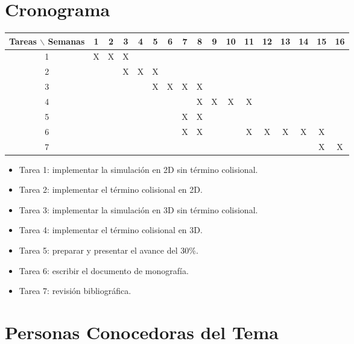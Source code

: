 \documentclass[12pt]{article}
\begin{document}
\section{Cronograma}

\begin{table}[htb]
	\begin{tabular}{|c|cccccccccccccccc| }
	\hline
	Tareas $\backslash$ Semanas & 1 & 2 & 3 & 4 & 5 & 6 & 7 & 8 & 9 & 10 & 11 & 12 & 13 & 14 & 15 & 16  \\
	\hline
	1 & X & X & X  &   &   &   &   &  &  &   &   &   &   &   &   &   \\
	2 &   &  & X & X & X &  &  &   &   &  &  &  &   &  &  &   \\
	3 &   &   &   &  & X  & X  & X  & X &   &   &   &  &   &   &  &   \\
	4 &  &  &  &  &  &  &  & X & X & X & X &   &   &   &   &   \\
    5 &  &  &  &  &  &  & X & X &  &  &  &   &   &   &   &   \\
	6 &   &   &   &   &  &   &  X & X  &  &   &  X & X &  X & X  & X &   \\
	7 &   &   &   &   &  &   &  &  &  &   &  & & &  & X & X  \\
	\hline
	\end{tabular}
\end{table}
\vspace{1mm}

\begin{itemize}
	\item Tarea 1: implementar la simulación en 2D sin término colisional.
	\item Tarea 2: implementar el término colisional en 2D.
	\item Tarea 3: implementar la simulación en 3D sin término colisional.
    \item Tarea 4: implementar el término colisional en 3D.
    \item Tarea 5: preparar y presentar el avance del 30\%.
    \item Tarea 6: escribir el documento de monografía.
    \item Tarea 7: revisión bibliográfica.
\end{itemize}

\section{Personas Conocedoras del Tema}

\end{document}
